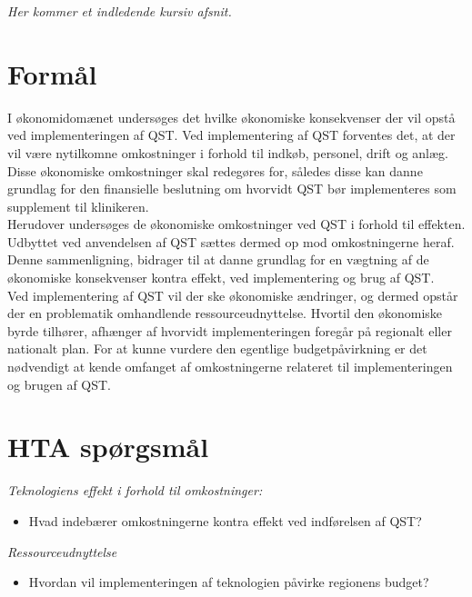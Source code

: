 \textit{Her kommer et indledende kursiv afsnit.}
\section{Formål}
I økonomidomænet undersøges det hvilke økonomiske konsekvenser der vil opstå ved implementeringen af QST. Ved implementering af QST forventes det, at der vil være nytilkomne omkostninger i forhold til indkøb, personel, drift og anlæg. Disse økonomiske omkostninger skal redegøres for, således disse kan danne grundlag for den finansielle beslutning om hvorvidt QST bør implementeres som supplement til klinikeren. \\
Herudover undersøges de økonomiske omkostninger ved QST i forhold til effekten. Udbyttet ved anvendelsen af QST sættes dermed op mod omkostningerne heraf. Denne sammenligning, bidrager til at danne grundlag for en vægtning af de økonomiske konsekvenser kontra effekt, ved implementering og brug af QST. \\ 
Ved implementering af QST vil der ske økonomiske ændringer, og dermed opstår der en problematik omhandlende ressourceudnyttelse. Hvortil den økonomiske byrde tilhører, afhænger af hvorvidt implementeringen foregår på regionalt eller nationalt plan. For at kunne vurdere den egentlige budgetpåvirkning er det nødvendigt at kende omfanget af  omkostningerne relateret til implementeringen og brugen af QST. 
\section{HTA spørgsmål}
\textit{Teknologiens effekt i forhold til omkostninger:}
\begin{itemize}
	\item Hvad indebærer omkostningerne kontra effekt ved indførelsen af QST? %
\end{itemize}

\textit{Ressourceudnyttelse}
\begin{itemize}
	\item Hvordan vil implementeringen af teknologien påvirke regionens budget?%
\end{itemize}


